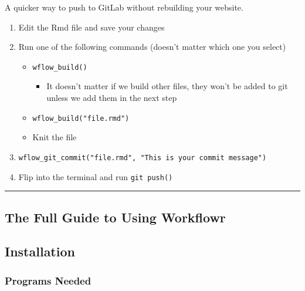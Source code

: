 \documentclass[openany]{book}
\providecommand{\tightlist}{%
  \setlength{\itemsep}{0pt}\setlength{\parskip}{0pt}}
\begin{document}
A quicker way to push to GitLab without rebuilding your website.

\begin{enumerate}
\def\labelenumi{\arabic{enumi}.}
\tightlist
\item
  Edit the Rmd file and save your changes
\item
  Run one of the following commands (doesn't matter which one you select)

  \begin{itemize}
  \tightlist
  \item
    \texttt{wflow\_build()}

    \begin{itemize}
    \tightlist
    \item
      It doesn't matter if we build other files, they won't be added to git unless we add them in the next step
    \end{itemize}
  \item
    \texttt{wflow\_build("file.rmd")}
  \item
    Knit the file
  \end{itemize}
\item
  \texttt{wflow\_git\_commit("file.rmd",\ "This\ is\ your\ commit\ message")}
\item
  Flip into the terminal and run \texttt{git\ push()}
\end{enumerate}

\begin{center}\rule{0.5\linewidth}{\linethickness}\end{center}

\hypertarget{the-full-guide-to-using-workflowr}{%
\subsection*{The Full Guide to Using Workflowr}\label{the-full-guide-to-using-workflowr}}

\hypertarget{installation}{%
\subsection{Installation}\label{installation}}

\hypertarget{programs-needed}{%
\subsubsection{Programs Needed}\label{programs-needed}}
\end{document}
